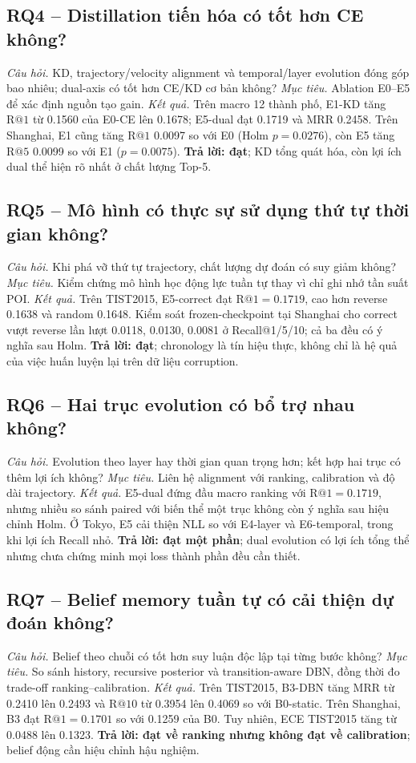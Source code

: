 \documentclass[runningheads]{llncs}
\makeatletter
\newcommand{\Rone}{\mathrm{R@1}}
\newcommand{\Rfive}{\mathrm{R@5}}
\newcommand{\Rten}{\mathrm{R@10}}
\makeatother
\begin{document}
\subsection{RQ4 -- Distillation tiến hóa có tốt hơn CE không?}
\textit{Câu hỏi.} KD, trajectory/velocity alignment và temporal/layer evolution đóng góp bao
nhiêu; dual-axis có tốt hơn CE/KD cơ bản không?
\textit{Mục tiêu.} Ablation E0--E5 để xác định nguồn tạo gain.
\textit{Kết quả.} Trên macro 12 thành phố, E1-KD tăng $\Rone$ từ 0.1560 của E0-CE lên 0.1678; E5-dual
đạt 0.1719 và MRR 0.2458. Trên Shanghai, E1 cũng tăng $\Rone$ 0.0097 so với E0
(Holm $p=0.0276$), còn E5 tăng $\Rfive$ 0.0099 so với E1 ($p=0.0075$).
\textbf{Trả lời: đạt}; KD tổng quát hóa, còn lợi ích dual thể hiện rõ nhất ở chất lượng Top-5.

\subsection{RQ5 -- Mô hình có thực sự sử dụng thứ tự thời gian không?}
\textit{Câu hỏi.} Khi phá vỡ thứ tự trajectory, chất lượng dự đoán có suy giảm không?
\textit{Mục tiêu.} Kiểm chứng mô hình học động lực tuần tự thay vì chỉ ghi nhớ tần suất POI.
\textit{Kết quả.} Trên TIST2015, E5-correct đạt $\Rone=0.1719$, cao hơn reverse 0.1638 và random 0.1648.
Kiểm soát frozen-checkpoint tại Shanghai cho correct vượt reverse lần lượt 0.0118, 0.0130,
0.0081 ở Recall@1/5/10; cả ba đều có ý nghĩa sau Holm. \textbf{Trả lời: đạt}; chronology là
tín hiệu thực, không chỉ là hệ quả của việc huấn luyện lại trên dữ liệu corruption.

\subsection{RQ6 -- Hai trục evolution có bổ trợ nhau không?}
\textit{Câu hỏi.} Evolution theo layer hay thời gian quan trọng hơn; kết hợp hai trục có thêm lợi ích không?
\textit{Mục tiêu.} Liên hệ alignment với ranking, calibration và độ dài trajectory.
\textit{Kết quả.} E5-dual đứng đầu macro ranking với $\Rone=0.1719$, nhưng nhiều so sánh paired với biến thể
một trục không còn ý nghĩa sau hiệu chỉnh Holm. Ở Tokyo, E5 cải thiện NLL so với E4-layer
và E6-temporal, trong khi lợi ích Recall nhỏ. \textbf{Trả lời: đạt một phần}; dual evolution có
lợi ích tổng thể nhưng chưa chứng minh mọi loss thành phần đều cần thiết.

\subsection{RQ7 -- Belief memory tuần tự có cải thiện dự đoán không?}
\textit{Câu hỏi.} Belief theo chuỗi có tốt hơn suy luận độc lập tại từng bước không?
\textit{Mục tiêu.} So sánh history, recursive posterior và transition-aware DBN, đồng thời đo
trade-off ranking--calibration.
\textit{Kết quả.} Trên TIST2015, B3-DBN tăng MRR từ 0.2410 lên 0.2493 và $\Rten$ từ 0.3954 lên 0.4069
so với B0-static. Trên Shanghai, B3 đạt $\Rone=0.1701$ so với 0.1259 của B0. Tuy nhiên,
ECE TIST2015 tăng từ 0.0488 lên 0.1323. \textbf{Trả lời: đạt về ranking nhưng không đạt về
calibration}; belief động cần hiệu chỉnh hậu nghiệm.
\end{document}
